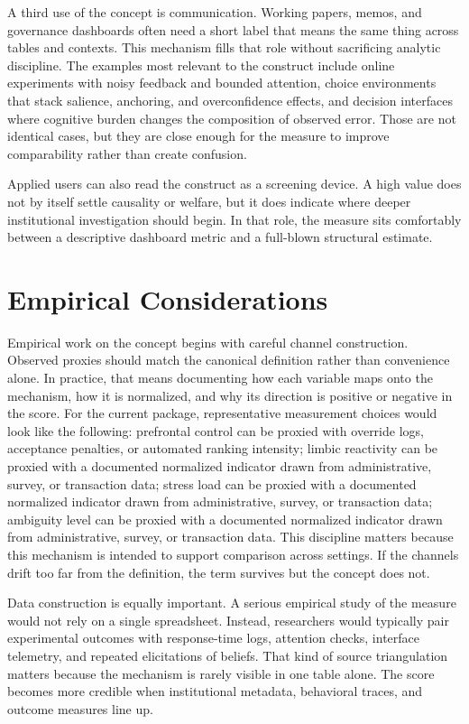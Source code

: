 \documentclass[12pt]{article}
\begin{document}
A third use of the concept is communication. Working papers, memos, and governance dashboards often need a short label that means the same thing across tables and contexts. This mechanism fills that role without sacrificing analytic discipline. The examples most relevant to the construct include online experiments with noisy feedback and bounded attention, choice environments that stack salience, anchoring, and overconfidence effects, and decision interfaces where cognitive burden changes the composition of observed error. Those are not identical cases, but they are close enough for the measure to improve comparability rather than create confusion.

Applied users can also read the construct as a screening device. A high value does not by itself settle causality or welfare, but it does indicate where deeper institutional investigation should begin. In that role, the measure sits comfortably between a descriptive dashboard metric and a full-blown structural estimate.

\section{Empirical Considerations}
Empirical work on the concept begins with careful channel construction. Observed proxies should match the canonical definition rather than convenience alone. In practice, that means documenting how each variable maps onto the mechanism, how it is normalized, and why its direction is positive or negative in the score. For the current package, representative measurement choices would look like the following: prefrontal control can be proxied with override logs, acceptance penalties, or automated ranking intensity; limbic reactivity can be proxied with a documented normalized indicator drawn from administrative, survey, or transaction data; stress load can be proxied with a documented normalized indicator drawn from administrative, survey, or transaction data; ambiguity level can be proxied with a documented normalized indicator drawn from administrative, survey, or transaction data. This discipline matters because this mechanism is intended to support comparison across settings. If the channels drift too far from the definition, the term survives but the concept does not.

Data construction is equally important. A serious empirical study of the measure would not rely on a single spreadsheet. Instead, researchers would typically pair experimental outcomes with response-time logs, attention checks, interface telemetry, and repeated elicitations of beliefs. That kind of source triangulation matters because the mechanism is rarely visible in one table alone. The score becomes more credible when institutional metadata, behavioral traces, and outcome measures line up.
\end{document}
